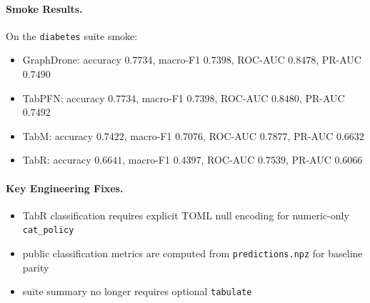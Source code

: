 \paragraph{Smoke Results.}
On the \texttt{diabetes} suite smoke:
\begin{itemize}
\item GraphDrone: accuracy $0.7734$, macro-F1 $0.7398$, ROC-AUC $0.8478$, PR-AUC $0.7490$
\item TabPFN: accuracy $0.7734$, macro-F1 $0.7398$, ROC-AUC $0.8480$, PR-AUC $0.7492$
\item TabM: accuracy $0.7422$, macro-F1 $0.7076$, ROC-AUC $0.7877$, PR-AUC $0.6632$
\item TabR: accuracy $0.6641$, macro-F1 $0.4397$, ROC-AUC $0.7539$, PR-AUC $0.6066$
\end{itemize}

\paragraph{Key Engineering Fixes.}
\begin{itemize}
\item TabR classification requires explicit TOML null encoding for numeric-only \texttt{cat\_policy}
\item public classification metrics are computed from \texttt{predictions.npz} for baseline parity
\item suite summary no longer requires optional \texttt{tabulate}
\end{itemize}
